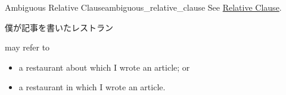 \documentclass{article}
\begin{document}
\begin{counterexample}{Ambiguous Relative Clause}{ambiguous_relative_clause}
    See \href{https://en.wikipedia.org/wiki/Relative_clause#Japanese}{Relative Clause}.
    \begin{center}
        僕が記事を書いたレストラン
    \end{center}
    may refer to
    \begin{itemize}
        \item a restaurant about which I wrote an article; or
        \item a restaurant in which I wrote an article.
    \end{itemize}
\end{counterexample}

% 
% 
\end{document}
